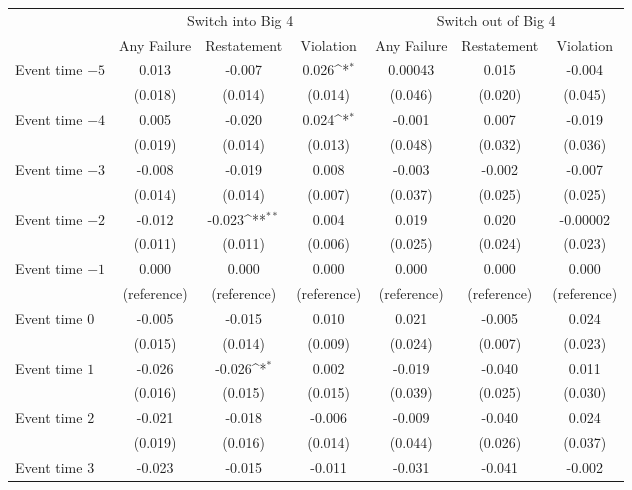 \documentclass[10pt]{article}
\newcommand{\sym}[1]{\textsuperscript{#1}}
\begin{document}
\begin{minipage}{19cm}\fontsize{10}{12}\selectfont\setlength{\tabcolsep}{4pt}\renewcommand{\arraystretch}{1.15}


\def\sym#1{\ifmmode^{#1}\else\(^{#1}\)\fi}
\centering
{}
\label{tab:big4-eventstudy-twfe}
\begin{threeparttable}

\begin{tabular}{l c c c c c c }
\toprule
 & \multicolumn{3}{c}{Switch into Big 4} & \multicolumn{3}{c}{Switch out of Big 4} \\
\cmidrule(lr){2-4}\cmidrule(lr){5-7}
 & Any Failure & Restatement & Violation & Any Failure & Restatement & Violation \\
\midrule
Event time $-5$ & 0.013 & -0.007 & 0.026\sym{*} & 0.00043 & 0.015 & -0.004 \\
 & (0.018) & (0.014) & (0.014) & (0.046) & (0.020) & (0.045) \\
Event time $-4$ & 0.005 & -0.020 & 0.024\sym{*} & -0.001 & 0.007 & -0.019 \\
 & (0.019) & (0.014) & (0.013) & (0.048) & (0.032) & (0.036) \\
Event time $-3$ & -0.008 & -0.019 & 0.008 & -0.003 & -0.002 & -0.007 \\
 & (0.014) & (0.014) & (0.007) & (0.037) & (0.025) & (0.025) \\
Event time $-2$ & -0.012 & -0.023\sym{**} & 0.004 & 0.019 & 0.020 & -0.00002 \\
 & (0.011) & (0.011) & (0.006) & (0.025) & (0.024) & (0.023) \\
Event time $-1$ & 0.000 & 0.000 & 0.000 & 0.000 & 0.000 & 0.000 \\
 & (reference) & (reference) & (reference) & (reference) & (reference) & (reference) \\
Event time $0$ & -0.005 & -0.015 & 0.010 & 0.021 & -0.005 & 0.024 \\
 & (0.015) & (0.014) & (0.009) & (0.024) & (0.007) & (0.023) \\
Event time $1$ & -0.026 & -0.026\sym{*} & 0.002 & -0.019 & -0.040 & 0.011 \\
 & (0.016) & (0.015) & (0.015) & (0.039) & (0.025) & (0.030) \\
Event time $2$ & -0.021 & -0.018 & -0.006 & -0.009 & -0.040 & 0.024 \\
 & (0.019) & (0.016) & (0.014) & (0.044) & (0.026) & (0.037) \\
Event time $3$ & -0.023 & -0.015 & -0.011 & -0.031 & -0.041 & -0.002 \\

\end{tabular}
\end{threeparttable}
\end{minipage}
\end{document}
